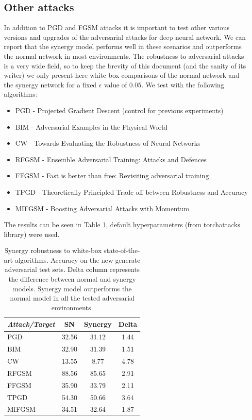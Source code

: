\documentclass[b5paper]{book}
\begin{document}
\subsection{Other attacks}

In addition to PGD and FGSM attacks it is important to test other various versions and upgrades of the adversarial attacks for deep neural network. We can report that the synergy model performs well in these scenarios and outperforms the normal network in most environments. The robustness to adversarial attacks is a very wide field, so to keep the brevity of this document (and the sanity of its writer) we only present here white-box comparisons of the normal network and the synergy network for a fixed \( \epsilon \) value of \( 0.05 \). We test with the following algorithms:

\begin{itemize}
    \item PGD - Projected Gradient Descent (control for previous experiments)
    \item BIM - Adversarial Examples in the Physical World 
    \item CW - Towards Evaluating the Robustness of Neural Networks
    \item RFGSM - Ensemble Adversarial Training: Attacks and Defences
    \item FFGSM - Fast is better than free: Revisiting adversarial training
    \item TPGD - Theoretically Principled Trade-off between Robustness and Accuracy
    \item MIFGSM - Boosting Adversarial Attacks with Momentum
\end{itemize}

The results can be seen in Table \ref{tab:results-others-synergy}, default hyperparameters (from torchattacks library) were used.

\begin{table}[ht]
  \centering
  \begin{tabular}{l|cc|c}
    \toprule
     \textit{Attack/Target} & {SN} & {Synergy} & Delta \\
    \midrule
    {PGD} & {32.56} & {31.12} & {1.44} \\
    {BIM} & {32.90} & {31.39} & {1.51} \\
    {CW} & {13.55} & {8.77} & {4.78} \\
    {RFGSM} & {88.56} & {85.65} & {2.91} \\
    {FFGSM} & {35.90} & {33.79} & {2.11} \\
    {TPGD} & {54.30} & {50.66} & {3.64} \\
    {MIFGSM} & {34.51} & {32.64} & {1.87} \\
    \bottomrule
  \end{tabular}
  \caption{Synergy robustness to white-box state-of-the-art algorithms. Accuracy on the new generate adversarial test sets. Delta column represents the difference between normal and synergy models. Synergy model outperforms the normal model in all the tested adversarial environments.}
  \label{tab:results-others-synergy}
\end{table} 
\end{document}
